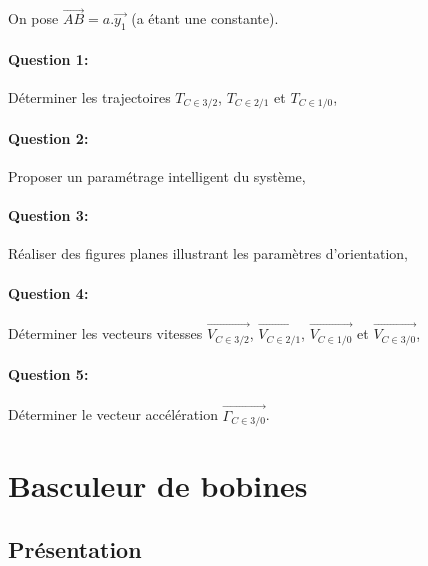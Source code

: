 On pose $\overrightarrow{AB}=a.\overrightarrow{y_1}$ (a étant une constante).

\paragraph{Question 1:} Déterminer les trajectoires $T_{C \in 3/2}$, $T_{C \in 2/1}$ et $T_{C \in 1/0}$,
\paragraph{Question 2:} Proposer un paramétrage intelligent du système,
\paragraph{Question 3:} Réaliser des figures planes illustrant les paramètres d'orientation,
\paragraph{Question 4:} Déterminer les vecteurs vitesses $\overrightarrow{V_{C \in 3/2}}$, $\overrightarrow{V_{C \in 2/1}}$, $\overrightarrow{V_{C \in 1/0}}$ et $\overrightarrow{V_{C \in 3/0}}$,
\paragraph{Question 5:} Déterminer le vecteur accélération $\overrightarrow{\Gamma_{C \in 3/0}}$.

\newpage

\section{Basculeur de bobines}

\subsection{Présentation}


